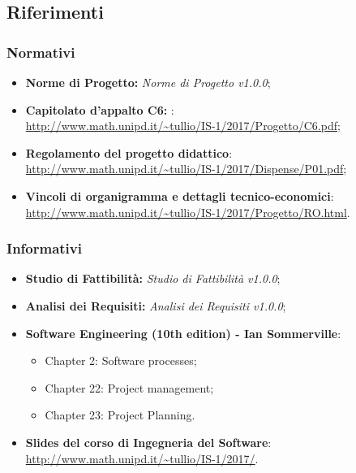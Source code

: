 \subsection{Riferimenti}
\subsubsection{Normativi}
\begin{itemize}
	\item \textbf{Norme di Progetto: }\textit{Norme di Progetto v1.0.0};
	\item \textbf{Capitolato d'appalto C6: \NomeProgetto}:\\
	\url{http://www.math.unipd.it/~tullio/IS-1/2017/Progetto/C6.pdf};
	\item \textbf{Regolamento del progetto didattico}:\\
	\url{http://www.math.unipd.it/~tullio/IS-1/2017/Dispense/P01.pdf};
	\item \textbf{Vincoli di organigramma e dettagli tecnico-economici}:\\
	\url{http://www.math.unipd.it/~tullio/IS-1/2017/Progetto/RO.html}.
\end{itemize}
\subsubsection{Informativi}
\begin{itemize}
	\item \textbf{Studio di Fattibilità: }\textit{Studio di Fattibilità v1.0.0};
	\item \textbf{Analisi dei Requisiti: }\textit{Analisi dei Requisiti v1.0.0};
	\item \textbf{Software Engineering (10th edition) - Ian Sommerville}:
	\begin{itemize}
		\item Chapter 2: Software processes;
		\item Chapter 22: Project management;
		\item Chapter 23: Project Planning.
	\end{itemize}
	\item \textbf{Slides del corso di Ingegneria del Software}:\\
	\url{http://www.math.unipd.it/~tullio/IS-1/2017/}.
\end{itemize}


